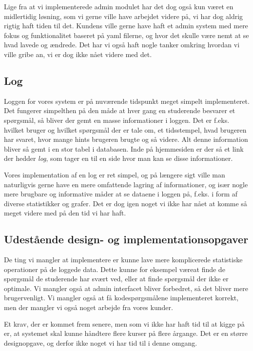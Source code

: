 \documentclass[11pt, a4paper]{article}
\begin{document}
Lige fra at vi implementerede admin modulet har det dog også kun været en midlertidig løsning, som vi gerne ville have arbejdet videre på, vi har dog aldrig rigtig haft tiden til det. Kundens ville gerne have haft et admin system med mere fokus og funktionalitet baseret på yaml filerne, og hvor det skulle være nemt at se hvad lavede og ændrede. Det har vi også haft nogle tanker omkring hvordan vi ville gribe an, vi er dog ikke nået videre med det.

\subsection{Log}
\label{sub:log}
Loggen for vores system er på nuværende tidspunkt meget simpelt implementeret. Det fungerer simpelthen på den måde at hver gang en studerende besvarer et spørgsmål, så bliver der gemt en masse informationer i loggen. Det er f.eks. hvilket bruger og hvilket spørgsmål der er tale om, et tidsstempel, hvad brugeren har svaret, hvor mange hints brugeren brugte og så videre. Alt denne information bliver så gemt i en stor tabel i databasen. Inde på hjemmesiden er der så et link der hedder \emph{log}, som tager en til en side hvor man kan se disse informationer.

Vores implementation af en log er ret simpel, og på længere sigt ville man naturligvis gerne have en mere omfattende lagring af informationer, og især nogle mere brugbare og informative måder at se dataene i loggen på, f.eks. i form af diverse statistikker og grafer. Det er dog igen noget vi ikke har nået at komme så meget videre med på den tid vi har haft.

\subsection{Udestående design- og implementationsopgaver}
\label{sub:udestaende_design_og_implementationsopgaver}
De ting vi mangler at implementere er kunne lave mere komplicerede statistiske operationer på de loggede data. Dette kunne for eksempel væreat finde de spørgsmål de studerende har svært ved, eller at finde spørgsmål der ikke er optimale. Vi mangler også at admin interfacet bliver forbedret, så det bliver mere brugervenligt. Vi mangler også at få kodespørgsmålene implementeret korrekt, men der mangler vi også noget arbejde fra vores kunder.

Et krav, der er kommet frem senere, men som vi ikke har haft tid til at kigge på er, at systemet skal kunne håndtere flere kurser på flere årgange. Det er en større designopgave, og derfor ikke noget vi har tid til i denne omgang.
\end{document}
